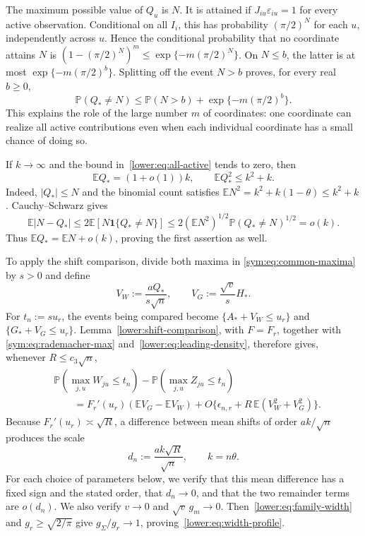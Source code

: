 \documentclass[11pt,letterpaper]{article}
\theoremstyle{remark}
\newcommand{\E}{\mathbb E}
\newcommand{\Pp}{\mathbb P}
\newcommand{\ind}{\mathbf 1}
\begin{document}
The maximum possible value of $Q_u$ is $N$. It is attained if
$J_{iu}\varepsilon_{iu}=1$ for every active observation.
Conditional on all $I_i$, this has probability $(\pi/2)^N$
for each $u$, independently across $u$. Hence the conditional
probability that no coordinate attains $N$ is
$(1-(\pi/2)^N)^m\le\exp\{-m(\pi/2)^N\}$.
On $N\le b$, the latter is at most $\exp\{-m(\pi/2)^b\}$.
Splitting off the event $N>b$ proves, for every real $b\ge0$,
\begin{equation}
 \Pp(Q_*\ne N)\le\Pp(N>b)+\exp\{-m(\pi/2)^b\}.
 \label{lower:eq:all-active}
\end{equation}
This explains the role of the large number $m$ of coordinates:
one coordinate can realize all active contributions even when
each individual coordinate has a small chance of doing so.

If $k\to\infty$ and the bound in~\eqref{lower:eq:all-active}
tends to zero, then
\begin{equation}
 \E Q_*=(1+o(1))k,\qquad \E Q_*^2\le k^2+k.
 \label{lower:eq:activation-moments}
\end{equation}
Indeed, $|Q_*|\le N$ and the binomial count satisfies
$\E N^2=k^2+k(1-\theta)\le k^2+k$. Cauchy--Schwarz gives
\[
 \E|N-Q_*|
 \le2\E[N\ind\{Q_*\ne N\}]
 \le2(\E N^2)^{1/2}\Pp(Q_*\ne N)^{1/2}=o(k).
\]
Thus $\E Q_*=\E N+o(k)$, proving the first assertion as well.

To apply the shift comparison, divide both maxima in
\eqref{sym:eq:common-maxima} by $s>0$ and define
\[
 V_W:=\frac{aQ_*}{s\sqrt n},\qquad V_G:=\frac{\sqrt v}{s}H_*.
\]
For $t_n:=su_r$, the events being compared become
$\{A_*+V_W\le u_r\}$ and $\{G_*+V_G\le u_r\}$.
Lemma~\ref{lower:shift-comparison}, with $F=F_r$, together with
\eqref{sym:eq:rademacher-max} and~\eqref{lower:eq:leading-density},
therefore gives, whenever $R\le c_3\sqrt n$,
\begin{equation}
\begin{split}
 &\Pp(\max_{j,u}W_{ju}\le t_n)-\Pp(\max_{j,u}Z_{ju}\le t_n)\\
 &\qquad=F_r'(u_r)(\E V_G-\E V_W)
       +O\{\epsilon_{n,r}+R\,\E(V_W^2+V_G^2)\}.
\end{split}
 \label{lower:eq:master-comparison}
\end{equation}
Because $F_r'(u_r)\asymp\sqrt R$, a difference between mean
shifts of order $ak/\sqrt n$ produces the scale
\begin{equation}
 d_n:=\frac{ak\sqrt R}{\sqrt n},\qquad k=n\theta.
 \label{lower:eq:proof-scale}
\end{equation}
For each choice of parameters below, we verify that this mean
difference has a fixed sign and the stated order, that $d_n\to0$,
and that the two remainder terms are $o(d_n)$.
We also verify $v\to0$ and $\sqrt v\,g_m\to0$.
Then~\eqref{lower:eq:family-width} and $g_r\ge\sqrt{2/\pi}$
give $g_\Sigma/g_r\to1$, proving~\eqref{lower:eq:width-profile}.
\end{document}
